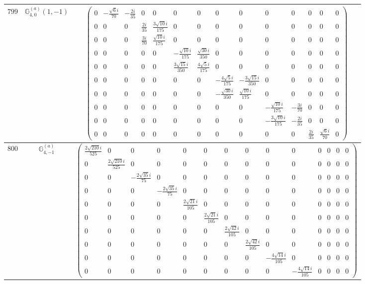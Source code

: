 \documentclass[fleqn,8pt,landscape]{jsarticle}
\begin{document}
\begin{center}
\begin{longtable}{ccc}
$ 799 $ & $ \mathbb{G}_{4,0}^{(a)}(1,-1) $ & $ \begin{pmatrix} 0 & - \frac{\sqrt{6} i}{70} & - \frac{2 i}{35} & 0 & 0 & 0 & 0 & 0 & 0 & 0 & 0 & 0 & 0 & 0 \\ 0 & 0 & 0 & \frac{2 i}{35} & \frac{3 \sqrt{10} i}{175} & 0 & 0 & 0 & 0 & 0 & 0 & 0 & 0 & 0 \\ 0 & 0 & 0 & \frac{3 i}{70} & \frac{\sqrt{10} i}{175} & 0 & 0 & 0 & 0 & 0 & 0 & 0 & 0 & 0 \\ 0 & 0 & 0 & 0 & 0 & - \frac{\sqrt{10} i}{175} & \frac{\sqrt{30} i}{350} & 0 & 0 & 0 & 0 & 0 & 0 & 0 \\ 0 & 0 & 0 & 0 & 0 & \frac{3 \sqrt{15} i}{350} & \frac{4 \sqrt{5} i}{175} & 0 & 0 & 0 & 0 & 0 & 0 & 0 \\ 0 & 0 & 0 & 0 & 0 & 0 & 0 & - \frac{4 \sqrt{5} i}{175} & - \frac{3 \sqrt{15} i}{350} & 0 & 0 & 0 & 0 & 0 \\ 0 & 0 & 0 & 0 & 0 & 0 & 0 & - \frac{\sqrt{30} i}{350} & \frac{\sqrt{10} i}{175} & 0 & 0 & 0 & 0 & 0 \\ 0 & 0 & 0 & 0 & 0 & 0 & 0 & 0 & 0 & - \frac{\sqrt{10} i}{175} & - \frac{3 i}{70} & 0 & 0 & 0 \\ 0 & 0 & 0 & 0 & 0 & 0 & 0 & 0 & 0 & - \frac{3 \sqrt{10} i}{175} & - \frac{2 i}{35} & 0 & 0 & 0 \\ 0 & 0 & 0 & 0 & 0 & 0 & 0 & 0 & 0 & 0 & 0 & \frac{2 i}{35} & \frac{\sqrt{6} i}{70} & 0 \end{pmatrix} $ \\ \hline
$ 800 $ & $ \mathbb{G}_{4,-1}^{(a)} $ & $ \begin{pmatrix} \frac{2 \sqrt{210} i}{525} & 0 & 0 & 0 & 0 & 0 & 0 & 0 & 0 & 0 & 0 & 0 & 0 & 0 \\ 0 & \frac{2 \sqrt{210} i}{525} & 0 & 0 & 0 & 0 & 0 & 0 & 0 & 0 & 0 & 0 & 0 & 0 \\ 0 & 0 & - \frac{2 \sqrt{35} i}{75} & 0 & 0 & 0 & 0 & 0 & 0 & 0 & 0 & 0 & 0 & 0 \\ 0 & 0 & 0 & - \frac{2 \sqrt{35} i}{75} & 0 & 0 & 0 & 0 & 0 & 0 & 0 & 0 & 0 & 0 \\ 0 & 0 & 0 & 0 & \frac{2 \sqrt{21} i}{105} & 0 & 0 & 0 & 0 & 0 & 0 & 0 & 0 & 0 \\ 0 & 0 & 0 & 0 & 0 & \frac{2 \sqrt{21} i}{105} & 0 & 0 & 0 & 0 & 0 & 0 & 0 & 0 \\ 0 & 0 & 0 & 0 & 0 & 0 & \frac{2 \sqrt{42} i}{105} & 0 & 0 & 0 & 0 & 0 & 0 & 0 \\ 0 & 0 & 0 & 0 & 0 & 0 & 0 & \frac{2 \sqrt{42} i}{105} & 0 & 0 & 0 & 0 & 0 & 0 \\ 0 & 0 & 0 & 0 & 0 & 0 & 0 & 0 & - \frac{4 \sqrt{14} i}{105} & 0 & 0 & 0 & 0 & 0 \\ 0 & 0 & 0 & 0 & 0 & 0 & 0 & 0 & 0 & - \frac{4 \sqrt{14} i}{105} & 0 & 0 & 0 & 0 \end{pmatrix} $ \\ \hline

\end{longtable}
\end{center}
\end{document}
